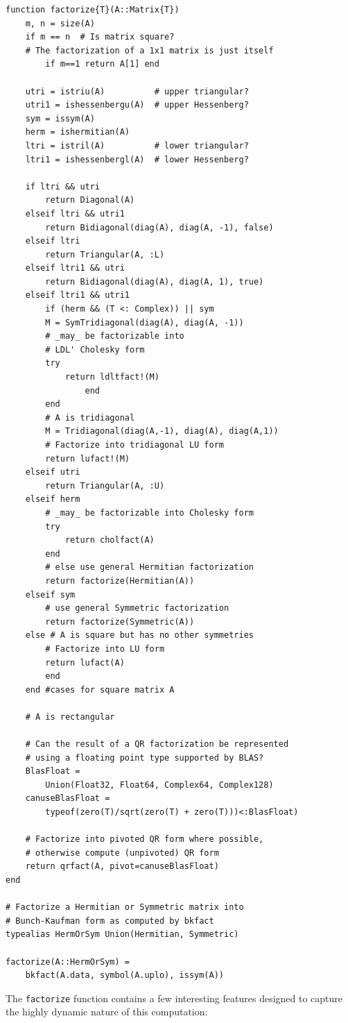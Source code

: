 \documentclass[10pt, preprint]{sigplanconf}
\begin{document}
\begin{lstlisting}
function factorize{T}(A::Matrix{T})
    m, n = size(A)
    if m == n  # Is matrix square?
	# The factorization of a 1x1 matrix is just itself
        if m==1 return A[1] end
	
	utri = istriu(A)          # upper triangular?
	utri1 = ishessenbergu(A)  # upper Hessenberg?
	sym = issym(A)
	herm = ishermitian(A)
	ltri = istril(A)          # lower triangular?
	ltri1 = ishessenbergl(A)  # lower Hessenberg?

	if ltri && utri
	    return Diagonal(A)
	elseif ltri && utri1
	    return Bidiagonal(diag(A), diag(A, -1), false)
	elseif ltri
	    return Triangular(A, :L)
	elseif ltri1 && utri
	    return Bidiagonal(diag(A), diag(A, 1), true)
	elseif ltri1 && utri1
	    if (herm && (T <: Complex)) || sym
		M = SymTridiagonal(diag(A), diag(A, -1))
		# _may_ be factorizable into
		# LDL' Cholesky form
		try
		    return ldltfact!(M)
                end
	    end
	    # A is tridiagonal
	    M = Tridiagonal(diag(A,-1), diag(A), diag(A,1))
	    # Factorize into tridiagonal LU form
	    return lufact!(M)
	elseif utri
	    return Triangular(A, :U)
	elseif herm
	    # _may_ be factorizable into Cholesky form
	    try
	        return cholfact(A)
	    end
	    # else use general Hermitian factorization
	    return factorize(Hermitian(A))
	elseif sym
	    # use general Symmetric factorization
	    return factorize(Symmetric(A))
	else # A is square but has no other symmetries
	    # Factorize into LU form
	    return lufact(A)
        end
    end #cases for square matrix A

    # A is rectangular
    
    # Can the result of a QR factorization be represented
    # using a floating point type supported by BLAS?
    BlasFloat =
    	Union(Float32, Float64, Complex64, Complex128)
    canuseBlasFloat = 
    	typeof(zero(T)/sqrt(zero(T) + zero(T)))<:BlasFloat)

    # Factorize into pivoted QR form where possible,
    # otherwise compute (unpivoted) QR form
    return qrfact(A, pivot=canuseBlasFloat)
end

# Factorize a Hermitian or Symmetric matrix into
# Bunch-Kaufman form as computed by bkfact
typealias HermOrSym Union(Hermitian, Symmetric)

factorize(A::HermOrSym) = 
	bkfact(A.data, symbol(A.uplo), issym(A))
\end{lstlisting}

The \verb|factorize| function contains a few interesting features
designed to capture the highly dynamic nature of this computation:
\end{document}
